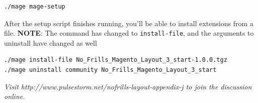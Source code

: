 \documentclass[oneside]{book}
\begin{document}
\begin{lstlisting}
./mage mage-setup

\end{lstlisting}


After the setup script finishes running, you'll be able to install extensions from a file. \textbf{NOTE}: The command has changed to \footnotesize\texttt{install-file}\normalsize, and the arguments to uninstall have changed as well

\begin{lstlisting}
./mage install-file No_Frills_Magento_Layout_3_start-1.0.0.tgz 
./mage uninstall community No_Frills_Magento_Layout_3_start

\end{lstlisting}


\emph{Visit http://www.pulsestorm.net/nofrills-layout-appendix-j to join the discussion online.}
\end{document}
